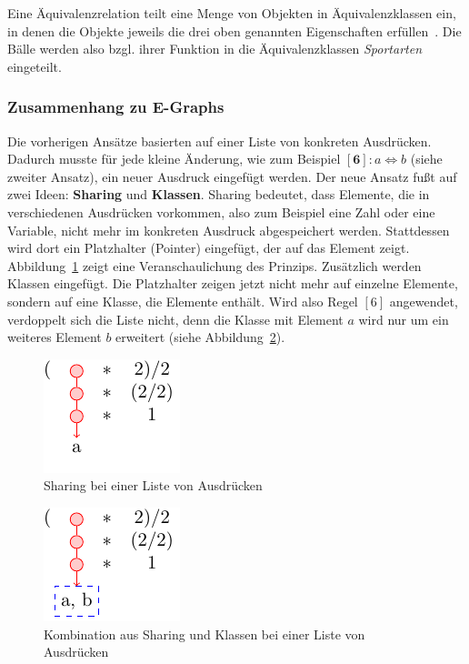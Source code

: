 Eine Äquivalenzrelation teilt eine Menge von Objekten in Äquivalenzklassen ein, in denen die Objekte jeweils die drei oben genannten Eigenschaften erfüllen~\cite{Ehrig2001}.
Die Bälle werden also bzgl. ihrer Funktion in die Äquivalenzklassen \textit{Sportarten} eingeteilt.

\subsubsection{Zusammenhang zu E-Graphs}

Die vorherigen Ansätze basierten auf einer Liste von konkreten Ausdrücken. Dadurch musste für jede kleine Änderung, wie zum Beispiel $[\mathbf{6}]: a \Leftrightarrow b$ (siehe zweiter Ansatz),
ein neuer Ausdruck eingefügt werden. Der neue Ansatz fußt auf zwei Ideen: \textbf{Sharing} und \textbf{Klassen}.
Sharing bedeutet, dass Elemente, die in verschiedenen Ausdrücken vorkommen, also zum Beispiel eine Zahl oder eine Variable, nicht mehr im konkreten Ausdruck abgespeichert werden.
Stattdessen wird dort ein Platzhalter (Pointer) eingefügt, der auf das Element zeigt. Abbildung~\ref{fig:sharing} zeigt eine Veranschaulichung des Prinzips.
Zusätzlich werden Klassen eingefügt. Die Platzhalter zeigen jetzt nicht mehr auf einzelne Elemente, sondern auf eine Klasse, die Elemente enthält. Wird also Regel $[6]$ angewendet,
verdoppelt sich die Liste nicht, denn die Klasse mit Element $a$ wird nur um ein weiteres Element $b$ erweitert (siehe Abbildung~\ref{fig:classes}). 

{
\begin{minipage}[c]{0.5\linewidth}
    \begin{figure}[H]
        \centering
        \includegraphics[scale=1.6]{../fig/sharing.pdf}
        \caption{Sharing bei einer Liste von Ausdrücken}
        \label{fig:sharing}
    \end{figure}
    \end{minipage}
    \begin{minipage}[c]{0.5\linewidth}
    \begin{figure}[H]
        \centering
        \includegraphics[scale=1.6]{../fig/classes.pdf}
        \caption{Kombination aus Sharing und Klassen bei einer Liste von Ausdrücken}
        \label{fig:classes}
    \end{figure}
\end{minipage}}

